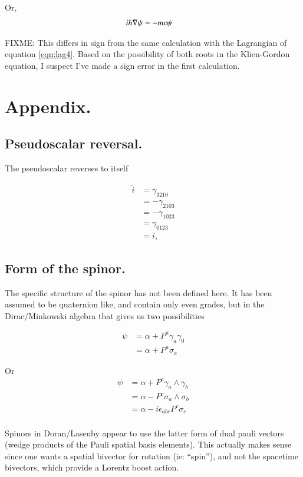 \documentclass{article}
\begin{document}
Or,
\begin{align*}
i \hbar \nabla \psi &= -m c \psi 
\end{align*}

FIXME: This differs in sign from the same calculation with the Lagrangian of equation \ref{eqn:lag4}.  Based on 
the possibility of both roots in the Klien-Gordon equation, I suspect I've made a sign error in the first
calculation.

\section{ Appendix. }

\subsection{ Pseudoscalar reversal. }

The pseudoscalar reverses to itself

\begin{align*}
\tilde{i}
&= \gamma_{3210} \\
&= -\gamma_{2103} \\
&= -\gamma_{1023} \\
&= \gamma_{0123} \\
&= i,
\end{align*}

\subsection{ Form of the spinor. }

The specific structure of the spinor has not been defined here.  It has been assumed to be quaternion like,
and contain only even grades, but in the Dirac/Minkowski algebra that gives us two possibilities

\begin{align*}
\psi
&= \alpha + P^a \gamma_a \gamma_0 \\
&= \alpha + P^a \sigma_a
\end{align*}

Or
\begin{align*}
\psi 
&= \alpha + P^c \gamma_a \wedge \gamma_b \\
&= \alpha - P^c \sigma_a \wedge \sigma_b \\
&= \alpha - i \epsilon_{a b c} P^c \sigma_c \\
\end{align*}

Spinors in Doran/Lasenby appear to use the latter form of dual pauli vectors (wedge products of the Pauli spatial basis elements).  This actually makes sense since one wants a spatial bivector for rotation (ie: ``spin''), and not the spacetime bivectors, which provide a Lorentz boost action.




\end{document}
